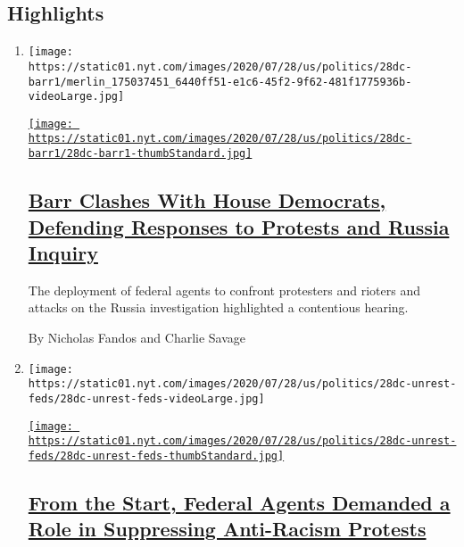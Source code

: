 \hypertarget{highlights}{%
\subsection{Highlights}\label{highlights}}

\begin{enumerate}
\def\labelenumi{\arabic{enumi}.}
\item
  \texttt{[image: https://static01.nyt.com/images/2020/07/28/us/politics/28dc-barr1/merlin\_175037451\_6440ff51-e1c6-45f2-9f62-481f1775936b-videoLarge.jpg]}

  \href{/2020/07/28/us/politics/barr-testimony.html}{\texttt{[image: https://static01.nyt.com/images/2020/07/28/us/politics/28dc-barr1/28dc-barr1-thumbStandard.jpg]}}

  \hypertarget{barr-clashes-with-house-democrats-defending-responses-to-protests-and-russia-inquiry}{%
  \subsection{\texorpdfstring{\href{/2020/07/28/us/politics/barr-testimony.html}{Barr
  Clashes With House Democrats, Defending Responses to Protests and
  Russia
  Inquiry}}{Barr Clashes With House Democrats, Defending Responses to Protests and Russia Inquiry}}\label{barr-clashes-with-house-democrats-defending-responses-to-protests-and-russia-inquiry}}

  The deployment of federal agents to confront protesters and rioters
  and attacks on the Russia investigation highlighted a contentious
  hearing.

  By Nicholas Fandos and Charlie Savage
\item
  \texttt{[image: https://static01.nyt.com/images/2020/07/28/us/politics/28dc-unrest-feds/28dc-unrest-feds-videoLarge.jpg]}

  \href{/2020/07/28/us/federal-agents-portland-seattle-protests.html}{\texttt{[image: https://static01.nyt.com/images/2020/07/28/us/politics/28dc-unrest-feds/28dc-unrest-feds-thumbStandard.jpg]}}

  \hypertarget{from-the-start-federal-agents-demanded-a-role-in-suppressing-anti-racism-protests}{%
  \subsection{\texorpdfstring{\href{/2020/07/28/us/federal-agents-portland-seattle-protests.html}{From
  the Start, Federal Agents Demanded a Role in Suppressing Anti-Racism
  Protests}}{From the Start, Federal Agents Demanded a Role in Suppressing Anti-Racism Protests}}\label{from-the-start-federal-agents-demanded-a-role-in-suppressing-anti-racism-protests}}


\end{enumerate}

